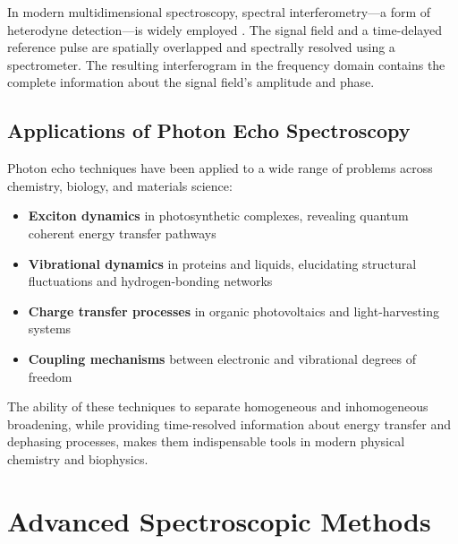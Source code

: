 \noindent In modern multidimensional spectroscopy, spectral interferometry—a form of heterodyne detection—is widely employed \cite{HyblEtAl1998TwodimensionalElectronicSpectroscopy}. The signal field and a time-delayed reference pulse are spatially overlapped and spectrally resolved using a spectrometer. The resulting interferogram in the frequency domain contains the complete information about the signal field's amplitude and phase.

\subsection{Applications of Photon Echo Spectroscopy}
\label{subsec:echo_applications}

\noindent Photon echo techniques have been applied to a wide range of problems across chemistry, biology, and materials science:

\begin{itemize}
    \item \textbf{Exciton dynamics} in photosynthetic complexes, revealing quantum coherent energy transfer pathways %
    \item \textbf{Vibrational dynamics} in proteins and liquids, elucidating structural fluctuations and hydrogen-bonding networks \cite{HammZanni2011ConceptsMethods2D}
    \item \textbf{Charge transfer processes} in organic photovoltaics and light-harvesting systems
    \item \textbf{Coupling mechanisms} between electronic and vibrational degrees of freedom \cite{KhalilEtAl2004VibrationalCoherenceTransfer}
\end{itemize}

\noindent The ability of these techniques to separate homogeneous and inhomogeneous broadening, while providing time-resolved information about energy transfer and dephasing processes, makes them indispensable tools in modern physical chemistry and biophysics.


\section{Advanced Spectroscopic Methods}
\label{sec:advanced_methods}

